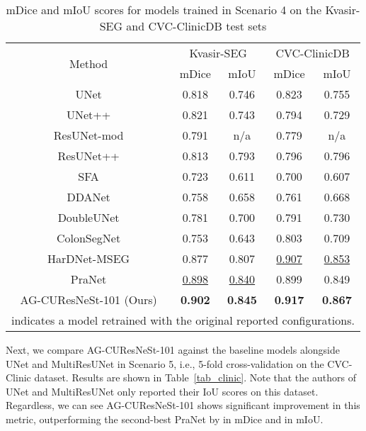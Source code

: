 \documentclass[review, sort&compress]{elsarticle}
\begin{document}
\begin{table} [ht!]
\centering
\caption{mDice and mIoU scores for models trained in Scenario 4 on the Kvasir-SEG and CVC-ClinicDB test sets}
\begin{tabular}{c|c c | c c}
\hline
\multirow{2}{*}{Method}               & \multicolumn{2}{c|}{Kvasir-SEG}  & \multicolumn{2}{c}{CVC-ClinicDB}   \\
\cline{2-3} \cline{4-5}
& mDice  & mIoU  & mDice  & mIoU   \\
\hline
\hline

UNet  \cite{ronneberger2015u}     & 0.818  & 0.746 & 0.823  & 0.755  \\
UNet++  \cite{zhou2019unet++}      & 0.821  & 0.743 & 0.794  & 0.729  \\
ResUNet-mod  \cite{zhang2018road}          & 0.791  & n/a   & 0.779  & n/a    \\
ResUNet++ \cite{jha2019resunet++}             & 0.813  & 0.793  & 0.796  & 0.796  \\
SFA \cite{fang2019selective}       & 0.723  & 0.611   & 0.700  & 0.607 \\

DDANet \cite{tomar2020ddanet}              & 0.758  & 0.658   & 0.761  & 0.668 \\

DoubleUNet \cite{jha2020doubleu}      & 0.781  & 0.700   & 0.791  & 0.730 \\

ColonSegNet \cite{jha2021real}      & 0.753 & 0.643   & 0.803  & 0.709 \\

HarDNet-MSEG \cite{huang2021hardnet}      & 0.877  & 0.807   & \underline{0.907}  & \underline{0.853} \\
PraNet \cite{fan2020pranet}       & \underline{0.898}  & \underline{0.840}   & 0.899  & 0.849 \\
\hline
\hline
AG-CUResNeSt-101 (Ours) & \textbf{0.902} & \textbf{0.845}  & \textbf{0.917}  & \textbf{0.867} \\
\hline
\multicolumn{5}{l}{ indicates a model retrained with the original reported configurations.
}
\end{tabular}
\label{tab_kvasir_clinic}
\end{table}

Next, we compare AG-CUResNeSt-101 against the baseline models alongside UNet \cite{ronneberger2015u} and MultiResUNet \cite{ibtehaz2020multiresunet} in Scenario 5, i.e., 5-fold cross-validation on the CVC-Clinic dataset. Results are shown in Table~\ref{tab_clinic}. Note that the authors of UNet and MultiResUNet only reported their IoU scores on this dataset. Regardless, we can see AG-CUResNeSt-101 shows significant improvement in this metric, outperforming the second-best PraNet by  in mDice and  in mIoU.
\end{document}
